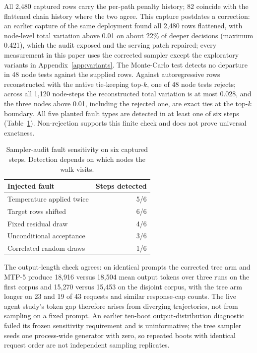 All 2,480 captured rows carry the per-path penalty history; 82 coincide with the flattened chain history where the two agree. This capture postdates a correction: an earlier capture of the same deployment found all 2,480 rows flattened, with node-level total variation above 0.01 on about 22\% of deeper decisions (maximum 0.421), which the audit exposed and the serving patch repaired; every measurement in this paper uses the corrected sampler except the exploratory variants in Appendix~\ref{app:variants}. The Monte-Carlo test detects no departure in 48 node tests against the supplied rows. Against autoregressive rows reconstructed with the native tie-keeping top-$k$, one of 48 node tests rejects; across all 1,120 node-steps the reconstructed total variation is at most 0.028, and the three nodes above 0.01, including the rejected one, are exact ties at the top-$k$ boundary. All five planted fault types are detected in at least one of six steps (Table~\ref{tab:sampling-faults}). Non-rejection supports this finite check and does not prove universal exactness.

\begin{table}[t]
\caption{Sampler-audit fault sensitivity on six captured steps. Detection depends on which nodes the walk visits.}
\label{tab:sampling-faults}
\centering\small
\begin{tabular}{@{}lr@{}}
\toprule
Injected fault & Steps detected \\
\midrule
Temperature applied twice & 5/6 \\
Target rows shifted & 6/6 \\
Fixed residual draw & 4/6 \\
Unconditional acceptance & 3/6 \\
Correlated random draws & 1/6 \\
\bottomrule
\end{tabular}
\end{table}

The output-length check agrees: on identical prompts the corrected tree arm and MTP-5 produce 18,916 versus 18,504 mean output tokens over three runs on the first corpus and 15,270 versus 15,453 on the disjoint corpus, with the tree arm longer on 23 and 19 of 43 requests and similar response-cap counts. The live agent study's token gap therefore arises from diverging trajectories, not from sampling on a fixed prompt. An earlier ten-boot output-distribution diagnostic failed its frozen sensitivity requirement and is uninformative; the tree sampler seeds one process-wide generator with zero, so repeated boots with identical request order are not independent sampling replicates.
